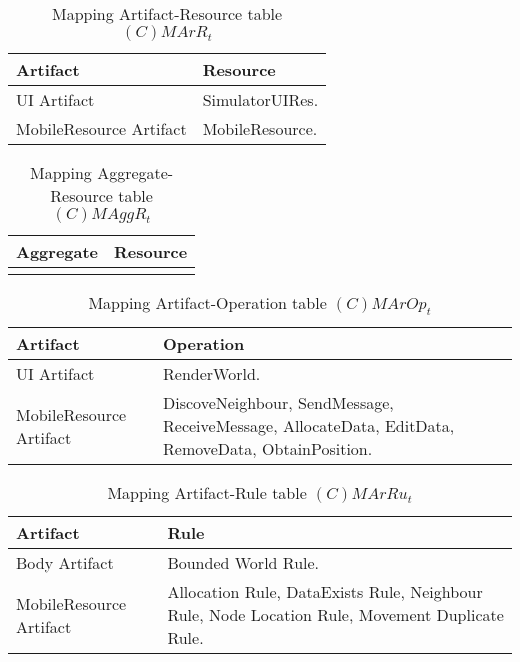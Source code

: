 \begin{table}[H]
	\centering
	\begin{tabular}{|p{4cm}|p{8cm}|}
			\hline
			\textbf{Artifact} & \textbf{Resource} \\
			\hline
			UI Artifact & SimulatorUIRes. \\
			\hline
			MobileResource Artifact & MobileResource. \\
			\hline
		\end{tabular}
	\caption{Mapping Artifact-Resource table $(C)MArR_t$}
	\label{tab:cmarrt}
\end{table}

\begin{table}[H]
	\centering
	\begin{tabular}{|p{4cm}|p{8cm}|}
			\hline
			\textbf{Aggregate} & \textbf{Resource} \\
			\hline
			& \\
			\hline
		\end{tabular}
	\caption{Mapping Aggregate-Resource table $(C)MAggR_t$}
	\label{tab:cmaggrt}
\end{table}

\begin{table}[H]
	\centering
	\begin{tabular}{|p{4cm}|p{8cm}|}
			\hline
			\textbf{Artifact} & \textbf{Operation} \\
			\hline
			UI Artifact & RenderWorld. \\
			\hline
      MobileResource Artifact & DiscoveNeighbour, SendMessage, ReceiveMessage,
      AllocateData, EditData, RemoveData, ObtainPosition. \\
			\hline
		\end{tabular}
	\caption{Mapping Artifact-Operation table $(C)MArOp_t$}
	\label{tab:cmaropt}
\end{table}

\begin{table}[H]
	\centering
	\begin{tabular}{|p{4cm}|p{8cm}|}
			\hline
			\textbf{Artifact} & \textbf{Rule} \\
			\hline
			Body Artifact & Bounded World Rule. \\
			\hline
			MobileResource Artifact & Allocation Rule, DataExists Rule, Neighbour Rule, Node Location
			Rule, Movement Duplicate Rule. \\
			\hline
		\end{tabular}
	\caption{Mapping Artifact-Rule table $(C)MArRu_t$}
	\label{tab:cmarrut}
\end{table}

